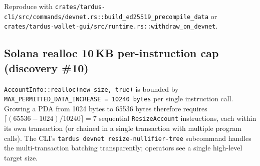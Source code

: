 Reproduce with
\texttt{crates/tardus-cli/src/commands/devnet.rs::build\_ed25519\_precompile\_data}
or
\texttt{crates/tardus-wallet-gui/src/runtime.rs::withdraw\_on\_devnet}.

\subsection{\texorpdfstring{Solana realloc 10\,KB per-instruction cap (discovery \#10)}{Solana realloc 10 KB per-instruction cap (discovery 10)}}
\label{sec:vec-realloc-cap}

\texttt{AccountInfo::realloc(new\_size, true)} is bounded by
\texttt{MAX\_PERMITTED\_DATA\_INCREASE = 10240 bytes} per single
instruction call. Growing a PDA from 1024 bytes to 65536 bytes
therefore requires
$\lceil (65536 - 1024) / 10240 \rceil = 7$ sequential
\texttt{ResizeAccount} instructions, each within its own
transaction (or chained in a single transaction with multiple
program calls). The CLI's
\texttt{tardus devnet resize-nullifier-tree} subcommand handles
the multi-transaction batching transparently; operators see a
single high-level target size.
